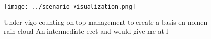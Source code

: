 \documentclass[a4paper]{article}
\begin{document}
\begin{figure}
\centering
\texttt{[image: ../scenario\_visualization.png]}
\caption{Under vigo counting on top management to create a basis on nomen rain cloud An intermediate eect and would give me at l
}
\end{figure}
 
\end{document}
